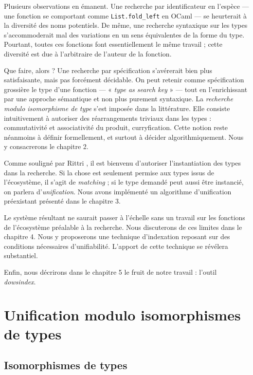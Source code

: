 \documentclass [a4paper] {report}
\theoremstyle {definition}
\newcommand {\dowsindex} {\textit{dowsindex}\xspace}
\begin{document}
Plusieurs observations en émanent. Une recherche par identificateur en l'espèce — une fonction se comportant comme \texttt {List.fold\_left} en OCaml — se heurterait à la diversité des noms potentiels. De même, une recherche syntaxique sur les types s'accommoderait mal des variations en un sens équivalentes de la forme du type. Pourtant, toutes ces fonctions font essentiellement le même travail ; cette diversité est due à l'arbitraire de l'auteur de la fonction.

Que faire, alors ? Une recherche par spécification s'avérerait bien plus satisfaisante, mais pas forcément décidable. On peut retenir comme spécification grossière le type d'une fonction — « \textit {type as search key} » — tout en l'enrichissant par une approche sémantique et non plus purement syntaxique. La \textit {recherche modulo isomorphisme de type} s'est imposée dans la littérature. Elle consiste intuitivement à autoriser des réarrangements triviaux dans les types : commutativité et associativité du produit, curryfication. Cette notion reste néanmoins à définir formellement, et surtout à décider algorithmiquement. Nous y consacrerons le chapitre 2.

Comme souligné par Rittri \cite {rittri93}, il est bienvenu d'autoriser l'instantiation des types dans la recherche. Si la chose est seulement permise aux types issus de l'écosystème, il s'agit de \emph {matching} ; si le type demandé peut aussi être instancié, on parlera d'\emph {unification}. Nous avons implémenté un algorithme d'unification préexistant \cite {boudet} présenté dans le chapitre 3.

Le système résultant ne saurait passer à l'échelle sans un travail sur les fonctions de l'écosystème préalable à la recherche. Nous discuterons de ces limites dans le chapitre 4. Nous y proposerons une technique d'indexation reposant sur des conditions nécessaires d'unifiabilité. L'apport de cette technique se révélera substantiel.

Enfin, nous décrirons dans le chapitre 5 le fruit de notre travail : l'outil  \dowsindex.


\chapter {Unification modulo isomorphismes de types}

\section {Isomorphismes de types}
\end{document}
